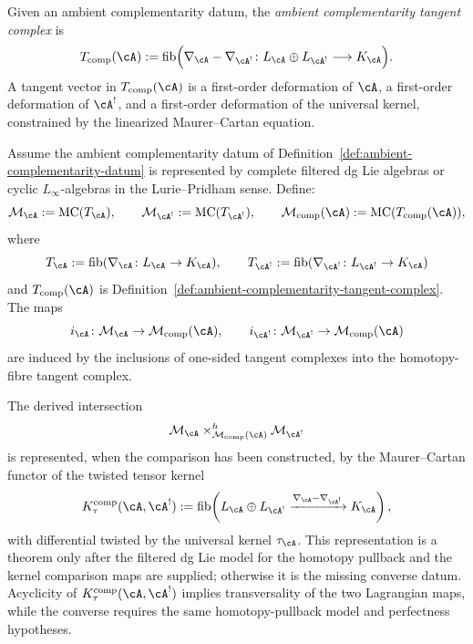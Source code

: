 \begin{definition}
\label{def:ambient-complementarity-tangent-complex}
Given an ambient complementarity datum, the
\emph{ambient complementarity tangent complex} is
\begin{equation}
\label{eq:ambient-tangent-complex}
T_{\mathrm{comp}}(\cA)
:=
\operatorname{fib}\Bigl(
\nabla_{\cA} - \nabla_{\cA^!} \colon
L_{\cA} \oplus L_{\cA^!} \longrightarrow K_{\cA}
\Bigr).
\end{equation}
A tangent vector in $T_{\mathrm{comp}}(\cA)$ is a first-order
deformation of $\cA$, a first-order deformation of $\cA^!$, and a
first-order deformation of the universal kernel, constrained by the
linearized Maurer--Cartan equation.
\end{definition}

\begin{definition}
\label{def:complementarity-formal-moduli}
Assume the ambient complementarity datum of
Definition~\ref{def:ambient-complementarity-datum} is represented by
complete filtered dg Lie algebras or cyclic \(L_\infty\)-algebras in
the Lurie--Pridham sense. Define:
\[
\mathcal M_{\cA}:=\mathrm{MC}(T_{\cA}),\qquad
\mathcal M_{\cA^!}:=\mathrm{MC}(T_{\cA^!}),\qquad
\mathcal M_{\mathrm{comp}}(\cA):=\mathrm{MC}(T_{\mathrm{comp}}(\cA)),
\]
where
\[
T_{\cA}:=\operatorname{fib}(\nabla_{\cA}\colon L_{\cA}\to K_{\cA}),
\qquad
T_{\cA^!}:=\operatorname{fib}(\nabla_{\cA^!}\colon L_{\cA^!}\to K_{\cA})
\]
and \(T_{\mathrm{comp}}(\cA)\) is
Definition~\ref{def:ambient-complementarity-tangent-complex}. The
maps
\[
i_{\cA}\colon \mathcal M_{\cA}\to\mathcal M_{\mathrm{comp}}(\cA),
\qquad
i_{\cA^!}\colon \mathcal M_{\cA^!}\to\mathcal M_{\mathrm{comp}}(\cA)
\]
are induced by the inclusions of one-sided tangent complexes into the
homotopy-fibre tangent complex.

The derived intersection
\[
\mathcal M_{\cA}\times^h_{\mathcal M_{\mathrm{comp}}(\cA)}
\mathcal M_{\cA^!}
\]
is represented, when the comparison has been constructed, by the
Maurer--Cartan functor of the twisted tensor kernel
\[
K^{\mathrm{comp}}_{\tau}(\cA,\cA^!)
:=
\operatorname{fib}\!\left(
L_{\cA}\oplus L_{\cA^!}\xrightarrow{\nabla_{\cA}-\nabla_{\cA^!}}
K_{\cA}\right),
\]
with differential twisted by the universal kernel
\(\tau_{\cA}\). This representation is a theorem only after the
filtered dg Lie model for the homotopy pullback and the kernel
comparison maps are supplied; otherwise it is the missing converse
datum. Acyclicity of \(K^{\mathrm{comp}}_{\tau}(\cA,\cA^!)\) implies
transversality of the two Lagrangian maps, while the converse
requires the same homotopy-pullback model and perfectness hypotheses.
\end{definition}

